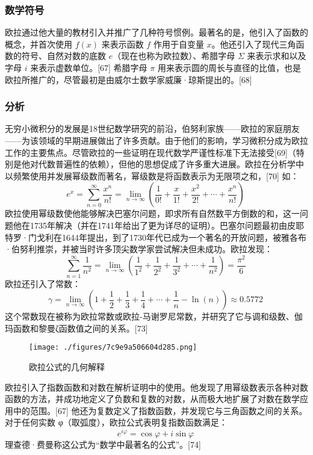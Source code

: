 \subsubsection{数学符号}
欧拉通过他大量的教材引入并推广了几种符号惯例。最著名的是，他引入了函数的概念，并首次使用 \( f(x) \) 来表示函数 \( f \) 作用于自变量 \( x \)。他还引入了现代三角函数的符号、自然对数的底数 \( e \)（现在也称为欧拉数）、希腊字母 \( \Sigma \) 来表示求和以及字母 \( i \) 来表示虚数单位。[67] 希腊字母 \( \pi \) 用来表示圆的周长与直径的比值，也是欧拉所推广的，尽管最初是由威尔士数学家威廉·琼斯提出的。[68]
\subsubsection{分析}
无穷小微积分的发展是18世纪数学研究的前沿，伯努利家族——欧拉的家庭朋友——为该领域的早期进展做出了许多贡献。由于他们的影响，学习微积分成为欧拉工作的主要焦点。尽管欧拉的一些证明在现代数学严谨性标准下无法接受[69]（特别是他对代数普遍性的依赖），但他的思想促成了许多重大进展。欧拉在分析学中以频繁使用并发展幂级数而著名，幂级数是将函数表示为无限项之和，[70] 如：
\[
e^{x}=\sum_{n=0}^{\infty} \frac{x^n}{n!} = \lim_{n \to \infty} \left( \frac{1}{0!} + \frac{x}{1!} + \frac{x^2}{2!} + \cdots + \frac{x^n}{n!} \right)~
\]
欧拉使用幂级数使他能够解决巴塞尔问题，即求所有自然数平方倒数的和，这一问题他在1735年解决（并在1741年给出了更为详尽的证明）。巴塞尔问题最初由皮耶特罗·门戈利在1644年提出，到了1730年代已成为一个著名的开放问题，被雅各布·伯努利推崇，并被当时许多顶尖数学家尝试解决但未成功。欧拉发现：
\[
\sum_{n=1}^{\infty} \frac{1}{n^2} = \lim_{n \to \infty} \left( \frac{1}{1^2} + \frac{1}{2^2} + \frac{1}{3^2} + \cdots + \frac{1}{n^2} \right) = \frac{\pi^2}{6}~
\]
欧拉还引入了常数：
\[
\gamma = \lim_{n \to \infty} \left( 1 + \frac{1}{2} + \frac{1}{3} + \frac{1}{4} + \cdots + \frac{1}{n} - \ln(n) \right) \approx 0.5772~
\]
这个常数现在被称为欧拉常数或欧拉-马谢罗尼常数，并研究了它与调和级数、伽玛函数和黎曼ζ函数值之间的关系。[73]
\begin{figure}[ht]
\centering
\texttt{[image: ./figures/7c9e9a506604d285.png]}
\caption{欧拉公式的几何解释} \label{fig_OL1_3}
\end{figure}
欧拉引入了指数函数和对数在解析证明中的使用。他发现了用幂级数表示各种对数函数的方法，并成功地定义了负数和复数的对数，从而极大地扩展了对数在数学应用中的范围。[67] 他还为复数定义了指数函数，并发现它与三角函数之间的关系。对于任何实数 φ（取弧度），欧拉公式表明复指数函数满足：
\[
e^{i\varphi} = \cos \varphi + i \sin \varphi~
\]
理查德·费曼称这公式为“数学中最著名的公式”。[74]


